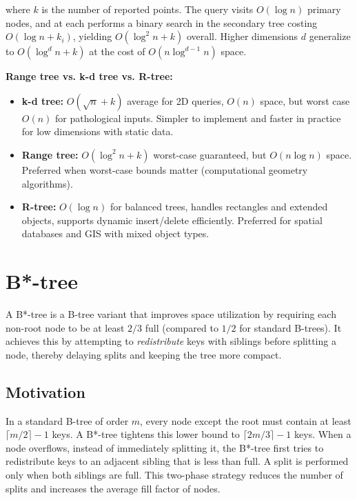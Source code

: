 where $k$ is the number of reported points. The query visits $O(\log n)$ primary nodes, and at each performs a binary search in the secondary tree costing $O(\log n + k_i)$, yielding $O(\log^{2} n + k)$ overall. Higher dimensions $d$ generalize to $O(\log^{d} n + k)$ at the cost of $O(n \log^{d-1} n)$ space.

\textbf{Range tree vs. k-d tree vs. R-tree:}
\begin{itemize}
\item \textbf{k-d tree:} $O(\sqrt{n} + k)$ average for 2D queries, $O(n)$ space, but worst case $O(n)$ for pathological inputs. Simpler to implement and faster in practice for low dimensions with static data.
\item \textbf{Range tree:} $O(\log^{2} n + k)$ worst-case guaranteed, but $O(n \log n)$ space. Preferred when worst-case bounds matter (computational geometry algorithms).
\item \textbf{R-tree:} $O(\log n)$ for balanced trees, handles rectangles and extended objects, supports dynamic insert/delete efficiently. Preferred for spatial databases and GIS with mixed object types.
\end{itemize}


\section{B*-tree}

A B*-tree is a B-tree variant that improves space utilization by requiring each non-root node to be at least $2/3$ full (compared to $1/2$ for standard B-trees). It achieves this by attempting to \emph{redistribute} keys with siblings before splitting a node, thereby delaying splits and keeping the tree more compact.

\subsection{Motivation}

In a standard B-tree of order $m$, every node except the root must contain at least $\lceil m/2 \rceil - 1$ keys. A B*-tree tightens this lower bound to $\lceil 2m/3 \rceil - 1$ keys. When a node overflows, instead of immediately splitting it, the B*-tree first tries to redistribute keys to an adjacent sibling that is less than full. A split is performed only when both siblings are full. This two-phase strategy reduces the number of splits and increases the average fill factor of nodes.


